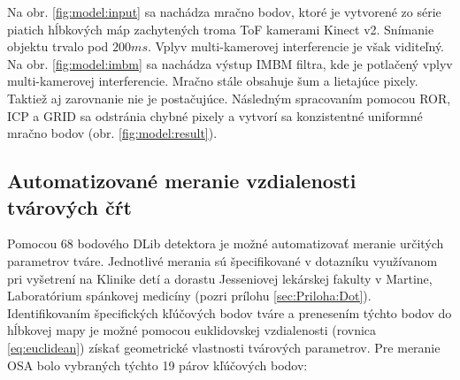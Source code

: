 Na obr. \ref{fig:model:input} sa nachádza mračno bodov, ktoré je vytvorené zo série piatich hĺbkových máp zachytených troma ToF kamerami Kinect v2. Snímanie objektu trvalo pod $200ms$. Vplyv multi-kamerovej interferencie je však viditeľný. Na obr. \ref{fig:model:imbm} sa nachádza výstup IMBM filtra, kde je potlačený vplyv multi-kamerovej interferencie. Mračno stále obsahuje šum a lietajúce pixely. Taktiež aj zarovnanie nie je postačujúce. Následným spracovaním pomocou ROR, ICP a GRID sa odstránia chybné pixely a vytvorí sa konzistentné uniformné mračno bodov (obr. \ref{fig:model:result}).


\newpage
\subsection{Automatizované meranie vzdialenosti tvárových čŕt}
Pomocou 68 bodového DLib detektora \cite{king2009dlib} je možné automatizovať meranie určitých parametrov tváre. Jednotlivé merania sú špecifikované v dotazníku využívanom pri vyšetrení na Klinike detí a dorastu
Jesseniovej lekárskej fakulty v Martine, Laboratórium spánkovej medicíny (pozri prílohu \ref{sec:Priloha:Dot}). 
Identifikovaním špecifických kľúčových bodov tváre a prenesením týchto bodov do hĺbkovej mapy je možné pomocou euklidovskej vzdialenosti (rovnica \ref{eq:euclidean}) získať geometrické vlastnosti tvárových parametrov.
Pre meranie OSA bolo vybraných týchto 19 párov kľúčových bodov: 
\vskip 0.2in


